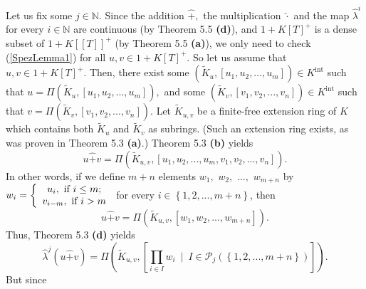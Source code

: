 \documentclass[numbers=enddot,12pt,final,onecolumn,notitlepage]{scrartcl}%
\begin{document}
Let us fix some $j\in\mathbb{N}$. Since the addition $\widehat{+},$ the
multiplication $\widehat{\cdot}$ and the map $\widehat{\lambda}^{i}$ for every
$i\in\mathbb{N}$ are continuous (by Theorem 5.5 \textbf{(d)}), and $1+K\left[
T\right]  ^{+}$ is a dense subset of $1+K\left[  \left[  T\right]  \right]
^{+}$ (by Theorem 5.5 \textbf{(a)}), we only need to check (\ref{SpezLemma1})
for all $u,v\in1+K\left[  T\right]  ^{+}$. So let us assume that
$u,v\in1+K\left[  T\right]  ^{+}$. Then, there exist some $\left(
\widetilde{K}_{u},\left[  u_{1},u_{2},...,u_{m}\right]  \right)  \in
K^{\operatorname*{int}}$ such that $u=\Pi\left(  \widetilde{K}_{u},\left[
u_{1},u_{2},...,u_{m}\right]  \right)  ,$ and some $\left(  \widetilde{K}%
_{v},\left[  v_{1},v_{2},...,v_{n}\right]  \right)  \in K^{\operatorname*{int}%
}$ such that $v=\Pi\left(  \widetilde{K}_{v},\left[  v_{1},v_{2}%
,...,v_{n}\right]  \right)  $. Let $\widetilde{K}_{u,v}$ be a finite-free
extension ring of $K$ which contains both $\widetilde{K}_{u}$ and
$\widetilde{K}_{v}$ as subrings. (Such an extension ring exists, as was proven
in Theorem 5.3 \textbf{(a)}.) Theorem 5.3 \textbf{(b)} yields%
\[
u\widehat{+}v=\Pi\left(  \widetilde{K}_{u,v},\left[  u_{1},u_{2}%
,...,u_{m},v_{1},v_{2},...,v_{n}\right]  \right)  .
\]
In other words, if we define $m+n$ elements $w_{1},$ $w_{2},$ $...,$ $w_{m+n}$
by $w_{i}=\left\{
\begin{array}
[c]{c}%
u_{i},\text{ if }i\leq m;\\
v_{i-m},\text{ if }i>m
\end{array}
\right.  $ for every $i\in\left\{  1,2,...,m+n\right\}  $, then%
\[
u\widehat{+}v=\Pi\left(  \widetilde{K}_{u,v},\left[  w_{1},w_{2}%
,...,w_{m+n}\right]  \right)  .
\]
Thus, Theorem 5.3 \textbf{(d)} yields%
\[
\widehat{\lambda}^{j}\left(  u\widehat{+}v\right)  =\Pi\left(  \widetilde{K}%
_{u,v},\left[  \prod\limits_{i\in I}w_{i}\ \mid\ I\in\mathcal{P}_{j}\left(
\left\{  1,2,...,m+n\right\}  \right)  \right]  \right)  .
\]
But since%
\end{document}
